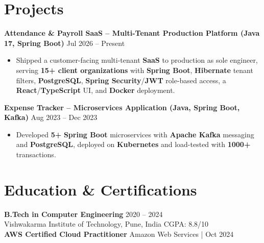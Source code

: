 \documentclass[a4paper,10pt]{article}
\begin{document}
\section*{Projects}

\textbf{Attendance \& Payroll SaaS -- Multi-Tenant Production Platform (Java 17, Spring Boot)} \hfill Jul 2026 -- Present
\begin{itemize}[leftmargin=*]
    \item Shipped a customer-facing multi-tenant \textbf{SaaS} to production as sole engineer, serving \textbf{15+ client organizations} with \textbf{Spring Boot}, \textbf{Hibernate} tenant filters, \textbf{PostgreSQL}, \textbf{Spring Security}/\textbf{JWT} role-based access, a \textbf{React}/\textbf{TypeScript} UI, and \textbf{Docker} deployment.
\end{itemize}

\textbf{Expense Tracker -- Microservices Application (Java, Spring Boot, Kafka)} \hfill Aug 2023 -- Dec 2023
\begin{itemize}[leftmargin=*]
    \item Developed \textbf{5+} \textbf{Spring Boot} microservices with \textbf{Apache Kafka} messaging and \textbf{PostgreSQL}, deployed on \textbf{Kubernetes} and load-tested with \textbf{1000+} transactions.
\end{itemize}

\section*{Education \& Certifications}
\textbf{B.Tech in Computer Engineering} \hfill 2020 -- 2024 \\
Vishwakarma Institute of Technology, Pune, India \hfill CGPA: 8.8/10 \\
\textbf{AWS Certified Cloud Practitioner} \hfill Amazon Web Services \;|\; Oct 2024
\end{document}
